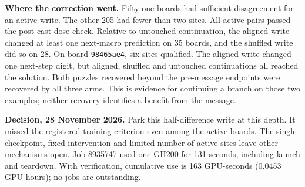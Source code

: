 \par
\textbf{Where the correction went.} Fifty-one boards had sufficient disagreement for an active write. The other 205 had fewer than two sites. All active pairs passed the post-cast dose check. Relative to untouched continuation, the aligned write changed at least one next-macro prediction on 35 boards, and the shuffled write did so on 28. On board \texttt{98465ae4}, six sites qualified. The aligned write changed one next-step digit, but aligned, shuffled and untouched continuations all reached the solution. Both puzzles recovered beyond the pre-message endpoints were recovered by all three arms. This is evidence for continuing a branch on those two examples; neither recovery identifies a benefit from the message.
\par
\textbf{Decision, 28 November 2026.} Park this half-difference write at this depth. It missed the registered training criterion even among the active boards. The single checkpoint, fixed intervention and limited number of active sites leave other mechanisms open. Job 8935747 used one GH200 for 131 seconds, including launch and teardown. With verification, cumulative use is 163 GPU-seconds (0.0453 GPU-hours); no jobs are outstanding.
